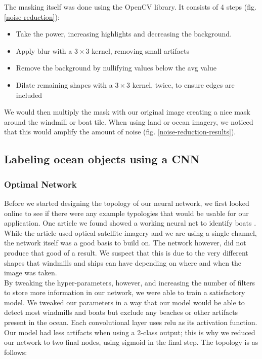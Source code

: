The masking itself was done using the OpenCV library. It consists of 4 steps (fig. \ref{noise-reduction}):

\begin{itemize}
    \item Take the power, increasing highlights and decreasing the background.
    \item Apply blur with a $3\times3$ kernel, removing small artifacts
    \item Remove the background by nullifying values below the avg value
    \item Dilate remaining shapes with a $3\times3$ kernel, twice, to ensure edges are included
\end{itemize}

We would then multiply the mask with our original image creating a nice mask around the windmill or boat tile. When using land or ocean imagery, we noticed that this would amplify the amount of noise (fig. \ref{noise-reduction-results}).

\subsection{Labeling ocean objects using a CNN}

\subsubsection{Optimal Network}

Before we started designing the topology of our neural network, we first looked online to see if there were any example typologies that would be usable for our application. One article we found showed a working neural net to identify boats \cite{moraite_2019}. While the article used optical satellite imagery and we are using a single channel, the network itself was a good basis to build on. The network however, did not produce that good of a result. We suspect that this is due to the very different shapes that windmills and ships can have depending on where and when the image was taken. \\

By tweaking the hyper-parameters, however, and increasing the number of filters to store more information in our network, we were able to train a satisfactory model. We tweaked our parameters in a way that our model would be able to detect most windmills and boats but exclude any beaches or other artifacts present in the ocean. Each convolutional layer uses relu as its activation function. Our model had less artifacts when using a 2-class output; this is why we reduced our network to two final nodes, using sigmoid in the final step. The topology is as follows:

